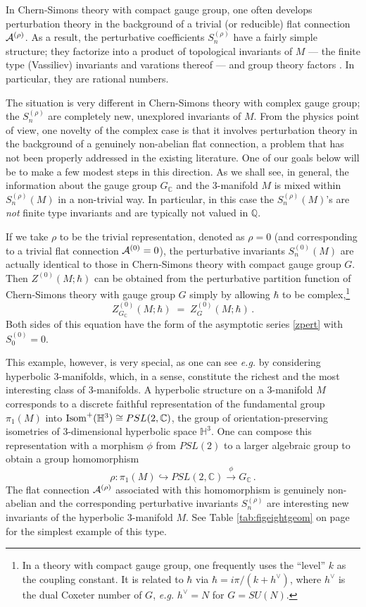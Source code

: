 \documentclass[hyper]{JHEP3}
\def\CA {{\cal A}}
\newcommand{\C}{{\mathbb{C}}}
\newcommand{\IH}{{\mathbb{H}}}
\newcommand\be{\begin{equation}}
\newcommand\ee{\end{equation}}
\def\={\;=\;}
\begin{document}
In Chern-Simons theory with compact gauge group, one often
develops perturbation theory in the background of a trivial (or reducible)
flat connection $\CA^{(\rho)}$. As a result, the perturbative
coefficients $S_{n}^{(\rho)}$ have a fairly simple structure;
they factorize into a product of topological invariants of $M$ --- the finite
type (Vassiliev) invariants and varations thereof --- and group theory factors \cite{labastida-1999}.
In particular, they are rational numbers.

The situation is very different in Chern-Simons theory
with complex gauge group; the $S_{n}^{(\rho)}$ are completely new,
unexplored invariants of $M$. From the physics point of view,
one novelty of the complex case is that it involves perturbation theory
in the background of a genuinely non-abelian flat connection,
a problem that has not been properly addressed in the existing literature.
One of our goals below will be to make a few modest steps in this direction.
As we shall see, in general, the information about the gauge group $G_{\C}$
and the 3-manifold $M$ is mixed within $S_n^{(\rho)} (M)$ in a non-trivial way.
In particular, in this case the $S_n^{(\rho)} (M)$'s are {\it not} finite type invariants
and are typically not valued in $\mathbb{Q}$.

If we take $\rho$ to be the trivial representation, denoted as $\rho=0$
(and corresponding to a trivial flat connection $\CA^{(0)} = 0$),
the perturbative invariants $S_n^{(0)} (M)$ are actually identical
to those in Chern-Simons theory with compact gauge group $G$.
Then $Z^{(0)} (M;\hbar)$ can be obtained from
the perturbative partition function of Chern-Simons theory
with gauge group $G$ simply by allowing $\hbar$ to be
complex,\footnote{In a theory with compact gauge group,
one frequently uses the ``level'' $k$ as the coupling constant.
It is related to $\hbar$ via $\hbar = i \pi / (k + h^{\vee})$,
where $h^{\vee}$ is the dual Coxeter number of $G$, {\it e.g.} $h^{\vee} = N$ for $G = SU(N)$.}
\be
Z_{G_{\C}}^{(0)} (M;\hbar) \= Z_G^{(0)} (M;\hbar)\,.
\ee
Both sides of this equation have the form of the asymptotic series \eqref{zpert}
with $S_0^{(0)} = 0$.

This example, however, is very special, as one can see {\it e.g.}
by considering hyperbolic 3-manifolds, which, in a sense,
constitute the richest and the most interesting class of 3-manifolds.
A hyperbolic structure on a 3-manifold $M$ corresponds to a discrete
faithful representation of the fundamental group $\pi_1 (M)$ into
${\rm Isom}^+ ( \IH^3 ) \cong PSL (2,\C)$, the group of orientation-preserving
isometries of 3-dimensional hyperbolic space $\IH^3$.
One can compose this representation with a morphism $\phi$ from $PSL (2)$
to a larger algebraic group to obtain a group homomorphism
\be
\rho : \pi_1 (M) \hookrightarrow  PSL(2,\C) \overset\phi\longrightarrow G_{\C}\,.
\label{rhogeom}
\ee
The flat connection $\CA^{(\rho)}$ associated with this
homomorphism is genuinely non-abelian and the corresponding
perturbative invariants $S_{n}^{(\rho)}$ are interesting new
invariants of the hyperbolic 3-manifold $M$.
See Table \ref{tab:figeightgeom} on page \pageref{tab:figeightgeom}
for the simplest example of this type.
\end{document}
